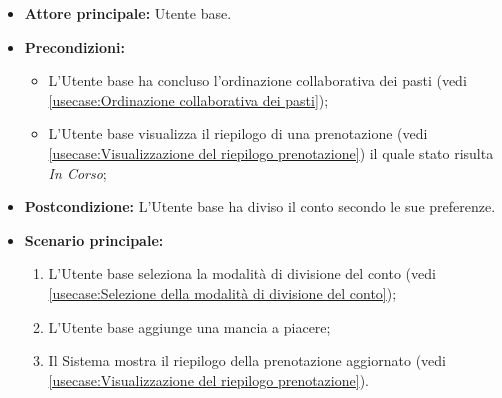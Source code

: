 \label{usecase:Divisione del conto}
\begin{itemize}
	\item \textbf{Attore principale:} Utente base.

	\item \textbf{Precondizioni:}  
	\begin{itemize}
		\item L'Utente base ha concluso l'ordinazione collaborativa dei pasti (vedi \autoref{usecase:Ordinazione collaborativa dei pasti});
		\item L'Utente base visualizza il riepilogo di una prenotazione (vedi \autoref{usecase:Visualizzazione del riepilogo prenotazione}) il quale stato risulta \textit{In Corso}; 
	\end{itemize}

	\item \textbf{Postcondizione:} L'Utente base ha diviso il conto secondo le
	      sue preferenze.

	\item \textbf{Scenario principale:}
	      \begin{enumerate}
		      \item L'Utente base seleziona la modalità di divisione del conto
		            (vedi \autoref{usecase:Selezione della modalità di divisione del conto});

			 \item  L'Utente base aggiunge una mancia a piacere;

		      \item Il Sistema mostra il riepilogo della prenotazione aggiornato
		            (vedi \autoref{usecase:Visualizzazione del riepilogo prenotazione}).

	      \end{enumerate}
\end{itemize}

